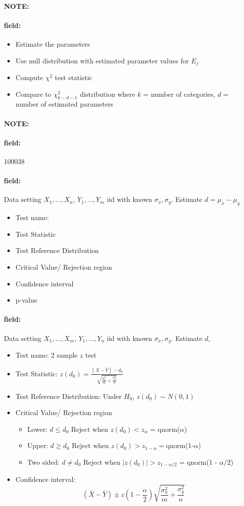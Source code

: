 \documentclass[12pt]{article}
\newenvironment{note}{\paragraph{NOTE:}}{}
\newenvironment{field}{\paragraph{field:}}{}
\begin{document}
\begin{note}
\begin{field}
\begin{itemize}
         \begin{itemize}
          \item Estimate the parameters
          \item Use null distribution with estimated parameter values for $E_j$
          \item Compute $\chi^2$ test statistic
          \item Compare to $\chi_{k-d-1}^2$ distribution where $k$ = number of categories, $d = $ number of estimated parameters
         \end{itemize}
  \end{itemize}
 \end{field}
\end{note}


\begin{note} \begin{field} \tiny 100038 \end{field}
 \begin{field}
  Data setting $X_1, \ldots , X_n$, $Y_1, \ldots, Y_m$ iid with known $\sigma_x, \sigma_y$. Estimate $d = \mu_x - \mu_y$
  \begin{itemize}
   \item Test name:
   \item Test Statistic
   \item Test Reference Distribution
   \item Critical Value/ Rejection region
   \item Confidence interval
   \item p-value
  \end{itemize}
 \end{field}
 \begin{field}
  Data setting $X_1, \ldots , X_m$, $Y_1, \ldots, Y_n$ iid with known $\sigma_x, \sigma_y$. Estimate $d$,
  \begin{itemize}
   \item Test name: 2 sample $z$ test
   \item Test Statistic: $z(d_0) = \frac{(\bar{X}- \bar{Y}) - d_0}{\sqrt{\frac{\sigma_x^2}{m} + \frac{\sigma_y^2}{n}}}$
   \item Test Reference Distribution: Under $H_0$, $z(d_0) \sim N(0,1)$
   \item Critical Value/ Rejection region
         \begin{itemize}
          \item Lower: $d \leq d_0$ Reject when $z(d_0) < z_{\alpha}$ = qnorm($\alpha$)
          \item Upper: $d \geq d_0$ Reject when $z(d_0) > z_{1 - \alpha} = $qnorm(1-$\alpha$)
          \item Two sided: $d \neq d_0$ Reject when $|z(d_0)| > z_{1 - \alpha/2}$ = qnorm(1 - $\alpha/2$)
         \end{itemize}
   \item Confidence interval: $$ (\bar{X} - \bar{Y}) \pm z(1 - \frac{\alpha}{2})\sqrt{\frac{\sigma_x^2}{m} + \frac{\sigma_y^2}{n}} $$
  \end{itemize}
 \end{field}
\end{note}
\end{document}
